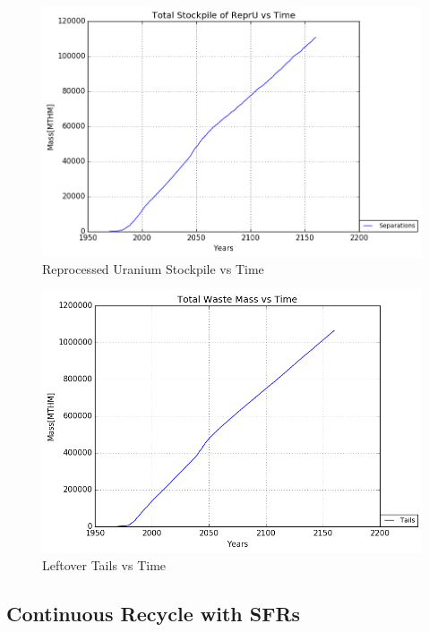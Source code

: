 \begin{figure}
	\includegraphics[width=\linewidth]{./images/reprocess/Separations_Total_Stockpile.png}
	\caption{Reprocessed Uranium Stockpile vs Time}
	\label{fig:reprocess_fuel}
\end{figure}

\begin{figure}
	\includegraphics[width=\linewidth]{./images/reprocess/Tails_total_Waste.png}
	\caption{Leftover Tails vs Time}
	\label{fig:reprocess_tails}
\end{figure}

\subsection{Continuous Recycle with \gls{SFR}s}